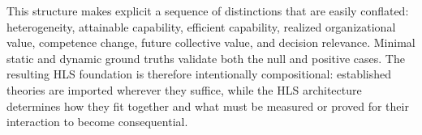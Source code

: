 \documentclass[10pt]{article}
\begin{document}
This structure makes explicit a sequence of distinctions that are easily conflated: heterogeneity, attainable capability, efficient capability, realized organizational value, competence change, future collective value, and decision relevance. Minimal static and dynamic ground truths validate both the null and positive cases. The resulting HLS foundation is therefore intentionally compositional: established theories are imported wherever they suffice, while the HLS architecture determines how they fit together and what must be measured or proved for their interaction to become consequential.

\printbibliography
\end{document}
